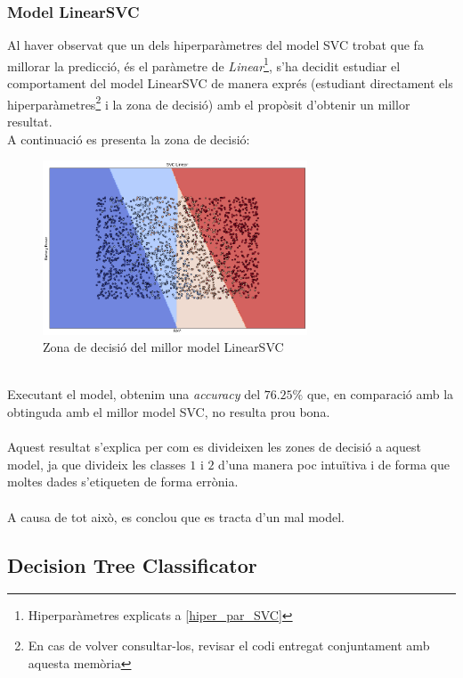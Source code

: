 \documentclass[a4paper, 11pt]{article}
\begin{document}
\subsubsection{Model LinearSVC}\label{zona_linearsvc}
Al haver observat que un dels hiperparàmetres del model SVC trobat que fa millorar la predicció, és el paràmetre de \textit{Linear}\footnote{Hiperparàmetres explicats a \textcolor{blue}{\ref{hiper_par_SVC}}}, s'ha decidit estudiar el comportament del model LinearSVC de manera exprés (estudiant directament els hiperparàmetres\footnote{En cas de volver consultar-los, revisar el codi entregat conjuntament amb aquesta memòria} i la zona de decisió) amb el propòsit d'obtenir un millor resultat.\\
A continuació es presenta la zona de decisió:
\begin{figure}[h]
    \centering
    \includegraphics[width = 0.7\textwidth]{ZonasModelos/zona_linear.png}
    \caption{Zona de decisió del millor model LinearSVC}
    \label{fig:my_label}
\end{figure}\\
Executant el model, obtenim una \textit{accuracy} del $76.25\%$ que, en comparació amb la obtinguda amb el millor model SVC, no resulta prou bona.\\\\
Aquest resultat s'explica per com es divideixen les zones de decisió a aquest model, ja que divideix les classes $1$ i $2$ d'una manera poc intuïtiva i de forma que moltes dades s'etiqueten de forma errònia.\\\\
A causa de tot això, es conclou que es tracta d'un mal model.
\newpage


\subsection{Decision Tree Classificator}\label{TREE}
\end{document}
